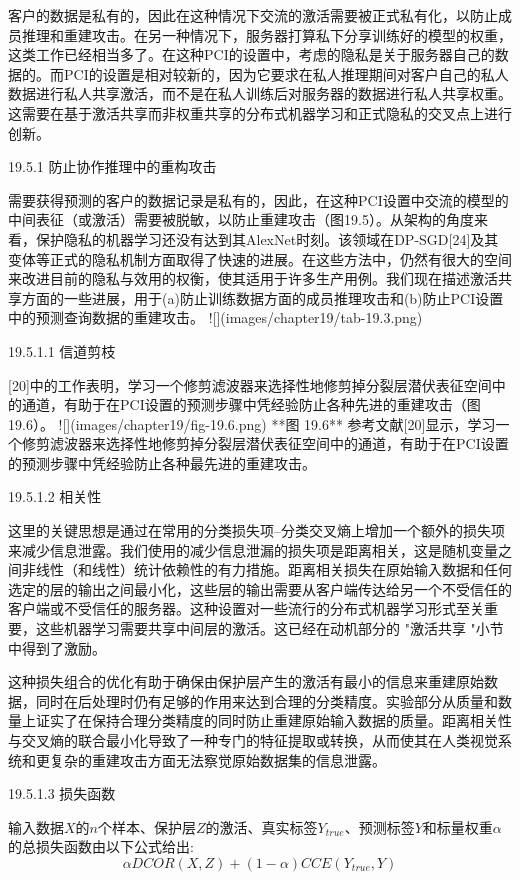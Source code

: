 客户的数据是私有的，因此在这种情况下交流的激活需要被正式私有化，以防止成员推理和重建攻击。在另一种情况下，服务器打算私下分享训练好的模型的权重，这类工作已经相当多了。在这种PCI的设置中，考虑的隐私是关于服务器自己的数据的。而PCI的设置是相对较新的，因为它要求在私人推理期间对客户自己的私人数据进行私人共享激活，而不是在私人训练后对服务器的数据进行私人共享权重。这需要在基于激活共享而非权重共享的分布式机器学习和正式隐私的交叉点上进行创新。

19.5.1 防止协作推理中的重构攻击

需要获得预测的客户的数据记录是私有的，因此，在这种PCI设置中交流的模型的中间表征（或激活）需要被脱敏，以防止重建攻击（图19.5）。从架构的角度来看，保护隐私的机器学习还没有达到其AlexNet时刻。该领域在DP-SGD[24]及其变体等正式的隐私机制方面取得了快速的进展。在这些方法中，仍然有很大的空间来改进目前的隐私与效用的权衡，使其适用于许多生产用例。我们现在描述激活共享方面的一些进展，用于(a)防止训练数据方面的成员推理攻击和(b)防止PCI设置中的预测查询数据的重建攻击。
![](images/chapter19/tab-19.3.png)

19.5.1.1 信道剪枝

[20]中的工作表明，学习一个修剪滤波器来选择性地修剪掉分裂层潜伏表征空间中的通道，有助于在PCI设置的预测步骤中凭经验防止各种先进的重建攻击（图19.6）。
![](images/chapter19/fig-19.6.png)
**图 19.6** 参考文献[20]显示，学习一个修剪滤波器来选择性地修剪掉分裂层潜伏表征空间中的通道，有助于在PCI设置的预测步骤中凭经验防止各种最先进的重建攻击。

19.5.1.2 相关性

这里的关键思想是通过在常用的分类损失项--分类交叉熵上增加一个额外的损失项来减少信息泄露。我们使用的减少信息泄漏的损失项是距离相关，这是随机变量之间非线性（和线性）统计依赖性的有力措施。距离相关损失在原始输入数据和任何选定的层的输出之间最小化，这些层的输出需要从客户端传达给另一个不受信任的客户端或不受信任的服务器。这种设置对一些流行的分布式机器学习形式至关重要，这些机器学习需要共享中间层的激活。这已经在动机部分的 "激活共享 "小节中得到了激励。

这种损失组合的优化有助于确保由保护层产生的激活有最小的信息来重建原始数据，同时在后处理时仍有足够的作用来达到合理的分类精度。实验部分从质量和数量上证实了在保持合理分类精度的同时防止重建原始输入数据的质量。距离相关性与交叉熵的联合最小化导致了一种专门的特征提取或转换，从而使其在人类视觉系统和更复杂的重建攻击方面无法察觉原始数据集的信息泄露。

19.5.1.3 损失函数

输入数据$X$的$n$个样本、保护层$Z$的激活、真实标签$Y_{true}$、预测标签$Y$和标量权重$\alpha$的总损失函数由以下公式给出:
$$
\alpha DCOR(X, Z) + (1 - \alpha) CCE(Y_{true}, Y)
$$

